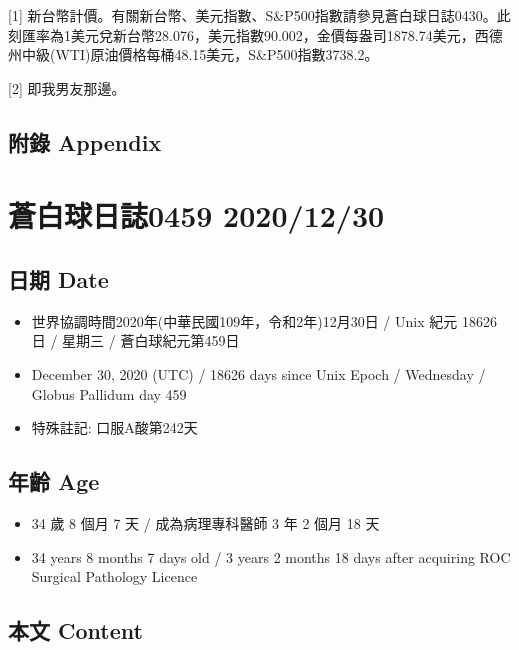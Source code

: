 \documentclass[a5paper, 11pt
]{book}
\providecommand{\tightlist}{%
  \setlength{\itemsep}{0pt}\setlength{\parskip}{0pt}}
\begin{document}
{[}1{]}
新台幣計價。有關新台幣、美元指數、S\&P500指數請參見蒼白球日誌0430。此刻匯率為1美元兌新台幣28.076，美元指數90.002，金價每盎司1878.74美元，西德州中級(WTI)原油價格每桶48.15美元，S\&P500指數3738.2。

{[}2{]} 即我男友那邊。

\hypertarget{ux9644ux9304-appendix-28}{%
\subsection{附錄 Appendix}\label{ux9644ux9304-appendix-28}}

\hypertarget{ux84bcux767dux7403ux65e5ux8a8c0459-20201230}{%
\section{蒼白球日誌0459
2020/12/30}\label{ux84bcux767dux7403ux65e5ux8a8c0459-20201230}}

\hypertarget{ux65e5ux671f-date-29}{%
\subsection{日期 Date}\label{ux65e5ux671f-date-29}}

\begin{itemize}
\tightlist
\item
  世界協調時間2020年(中華民國109年，令和2年)12月30日 / Unix 紀元 18626
  日 / 星期三 / 蒼白球紀元第459日
\item
  December 30, 2020 (UTC) / 18626 days since Unix Epoch / Wednesday /
  Globus Pallidum day 459
\item
  特殊註記: 口服A酸第242天
\end{itemize}

\hypertarget{ux5e74ux9f61-age-29}{%
\subsection{年齡 Age}\label{ux5e74ux9f61-age-29}}

\begin{itemize}
\tightlist
\item
  34 歲 8 個月 7 天 / 成為病理專科醫師 3 年 2 個月 18 天
\item
  34 years 8 months 7 days old / 3 years 2 months 18 days after
  acquiring ROC Surgical Pathology Licence
\end{itemize}

\hypertarget{ux672cux6587-content-29}{%
\subsection{本文 Content}\label{ux672cux6587-content-29}}
\end{document}
